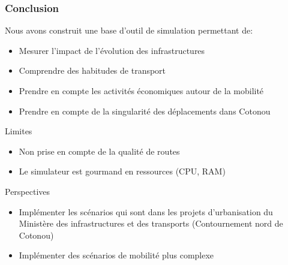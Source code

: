 \begin{frame}
    \frametitle{Conclusion}
    Nous avons construit une base d'outil de simulation permettant de:
    \begin{itemize}
        \item {} Mesurer l'impact de l'évolution des infrastructures
        \item {} Comprendre des habitudes de transport
        \item {} Prendre en compte les activités économiques autour de la mobilité
        \item {} Prendre en compte de la singularité des déplacements dans Cotonou
    \end{itemize}


    \begin{alertblock}{Limites}
        \begin{itemize}
            \item Non prise en compte de la qualité de routes
            \item Le simulateur est gourmand en ressources (CPU, RAM)
        \end{itemize}
    \end{alertblock}

    \begin{block}{Perspectives}
        \begin{itemize}
            \item Implémenter les scénarios qui sont dans les projets d'urbanisation du Ministère des infrastructures et des transports (Contournement nord de Cotonou)
            \item Implémenter des scénarios de mobilité plus complexe
        \end{itemize}
    \end{block}
\end{frame}

%

